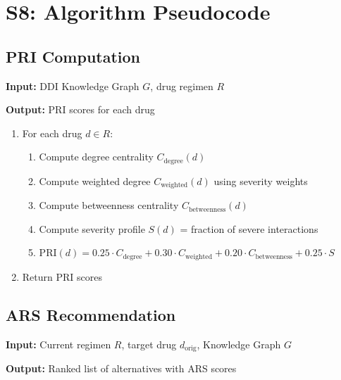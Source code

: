 \documentclass[11pt,a4paper]{article}
\begin{document}
\section{S8: Algorithm Pseudocode}

\subsection{PRI Computation}

\textbf{Input:} DDI Knowledge Graph $G$, drug regimen $R$

\textbf{Output:} PRI scores for each drug

\begin{enumerate}
    \item For each drug $d \in R$:
    \begin{enumerate}
        \item Compute degree centrality $C_{\text{degree}}(d)$
        \item Compute weighted degree $C_{\text{weighted}}(d)$ using severity weights
        \item Compute betweenness centrality $C_{\text{betweenness}}(d)$
        \item Compute severity profile $S(d)$ = fraction of severe interactions
        \item $\text{PRI}(d) = 0.25 \cdot C_{\text{degree}} + 0.30 \cdot C_{\text{weighted}} + 0.20 \cdot C_{\text{betweenness}} + 0.25 \cdot S$
    \end{enumerate}
    \item Return PRI scores
\end{enumerate}

\subsection{ARS Recommendation}

\textbf{Input:} Current regimen $R$, target drug $d_{\text{orig}}$, Knowledge Graph $G$

\textbf{Output:} Ranked list of alternatives with ARS scores
\end{document}

